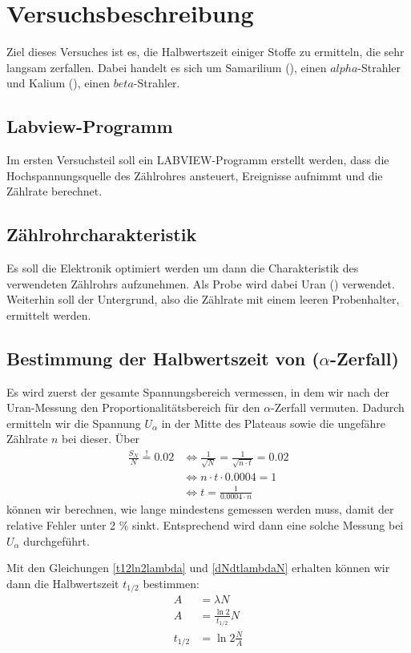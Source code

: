 \section{Versuchsbeschreibung}

Ziel dieses Versuches ist es, die Halbwertszeit einiger Stoffe zu ermitteln, die sehr langsam zerfallen. Dabei handelt es sich um Samarilium (), einen $alpha$-Strahler und Kalium (), einen $beta$-Strahler.

\subsection{Labview-Programm}
Im ersten Versuchsteil soll ein LABVIEW-Programm erstellt werden, dass die Hochspannungsquelle des Zählrohres ansteuert, Ereignisse aufnimmt und die Zählrate berechnet.

\subsection{Zählrohrcharakteristik}
Es soll die Elektronik optimiert werden um dann die Charakteristik des verwendeten Zählrohrs aufzunehmen. Als Probe wird dabei Uran () verwendet. Weiterhin soll der Untergrund, also die Zählrate mit einem leeren Probenhalter, ermittelt werden.

\subsection{Bestimmung der Halbwertszeit von  ($\alpha$-Zerfall)}
Es wird zuerst der gesamte Spannungsbereich vermessen, in dem wir nach der Uran-Messung den Proportionalitätsbereich für den $\alpha$-Zerfall vermuten. Dadurch ermitteln wir die Spannung $U_{\alpha}$ in der Mitte des Plateaus sowie die ungefähre Zählrate $n$ bei dieser. Über
\begin{align}
 \frac{S_N}{N} \stackrel{!}{=} 0.02 & \Leftrightarrow \frac{1}{\sqrt{N}} = \frac{1}{\sqrt{n \cdot t}} = 0.02 \\
				   & \Leftrightarrow n \cdot t \cdot 0.0004 = 1 \\
				   & \Leftrightarrow t = \frac{1}{0.0004 \cdot n} \label{zeitfuerkleinenfehler}
\end{align}
können wir berechnen, wie lange mindestens gemessen werden muss, damit der relative Fehler unter 2 \% sinkt. Entsprechend wird dann eine solche Messung bei $U_{\alpha}$ durchgeführt.

Mit den Gleichungen \ref{t12ln2lambda} und \ref{dNdtlambdaN} erhalten können wir dann die Halbwertszeit $t_{1/2}$ bestimmen:
\begin{align}
 A & = \lambda N \\
 A & = \frac{\ln 2}{t_{1/2}}N \\
 t_{1/2} & = \ln 2 \frac{N}{A}
\end{align}

